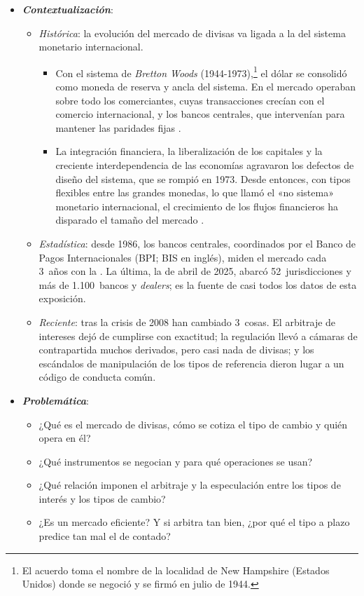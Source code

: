 \documentclass[11pt]{article}
\begin{document}
\begin{itemize}
\item \textbf{\emph{Contextualización}}:
  \begin{itemize}
  \item \emph{Histórica}: la evolución del mercado de divisas va ligada a la del sistema monetario internacional.
    \begin{itemize}
    \item Con el sistema de \emph{Bretton Woods} (1944-1973),\footnote{El acuerdo toma el nombre de la localidad de New Hampshire (Estados Unidos) donde se negoció y se firmó en julio de 1944.} el dólar se consolidó como moneda de reserva y ancla del sistema. En el mercado operaban sobre todo los comerciantes, cuyas transacciones crecían con el comercio internacional, y los bancos centrales, que intervenían para mantener las paridades fijas .
    \item La integración financiera, la liberalización de los capitales y la creciente interdependencia de las economías agravaron los defectos de diseño del sistema, que se rompió en 1973. Desde entonces, con tipos flexibles entre las grandes monedas, lo que  llamó el «no sistema» monetario internacional, el crecimiento de los flujos financieros ha disparado el tamaño del mercado .
    \end{itemize}
  \item \emph{Estadística}: desde 1986, los bancos centrales, coordinados por el Banco de Pagos Internacionales (BPI; BIS en inglés), miden el mercado cada 3~años con la . La última, la de abril de 2025, abarcó 52~jurisdicciones y más de 1.100~bancos y \emph{dealers}\nocite{BIS2025Trienal}; es la fuente de casi todos los datos de esta exposición.
  \item \emph{Reciente}: tras la crisis de 2008 han cambiado 3~cosas. El arbitraje de intereses dejó de cumplirse con exactitud; la regulación llevó a cámaras de contrapartida muchos derivados, pero casi nada de divisas; y los escándalos de manipulación de los tipos de referencia dieron lugar a un código de conducta común.
  \end{itemize}

\item \textbf{\emph{Problemática}}:
  \begin{itemize}
  \item ¿Qué es el mercado de divisas, cómo se cotiza el tipo de cambio y quién opera en él?
  \item ¿Qué instrumentos se negocian y para qué operaciones se usan?
  \item ¿Qué relación imponen el arbitraje y la especulación entre los tipos de interés y los tipos de cambio?
  \item ¿Es un mercado eficiente? Y si arbitra tan bien, ¿por qué el tipo a plazo predice tan mal el de contado?
  \end{itemize}


\end{itemize}
\end{document}
